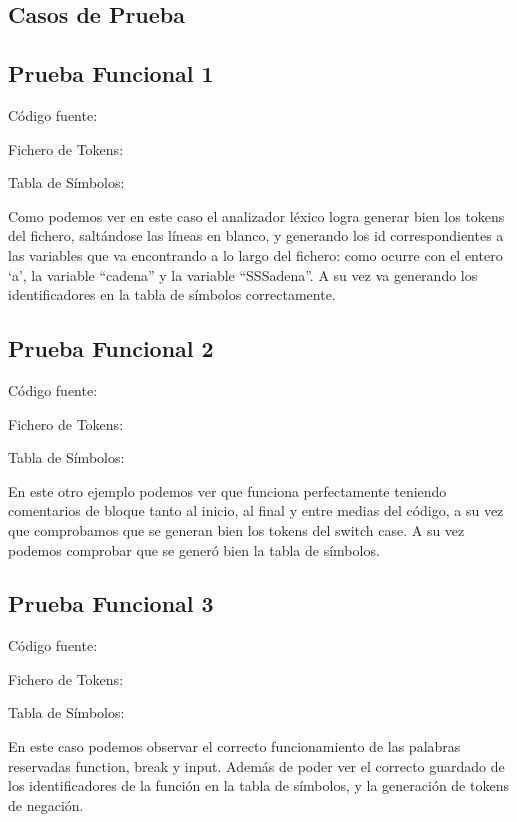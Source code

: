 \documentclass{article}[a4paper]
\begin{document}
\newpage
\begin{appendices}

\section{Casos de Prueba}

\subsection{Prueba Funcional 1}
Código fuente:

\hspace{\parindent} Fichero de Tokens:

\hspace{\parindent} Tabla de Símbolos:


Como podemos ver en este caso el analizador léxico logra generar bien los tokens del fichero,
saltándose las líneas en blanco, y generando los id correspondientes a las variables que va
encontrando a lo largo del fichero: como ocurre con el entero ‘a’, la variable “cadena” y la
variable “SSSadena”. A su vez va generando los identificadores en la tabla de símbolos correctamente.

\subsection{Prueba Funcional 2}
Código fuente:

\hspace{\parindent} Fichero de Tokens:

\hspace{\parindent} Tabla de Símbolos:

\hspace{\parindent} En este otro ejemplo podemos ver que funciona perfectamente teniendo comentarios de bloque tanto al inicio, al final y entre medias del código, a su vez que comprobamos que se
generan bien los tokens del switch case. A su vez podemos comprobar que se generó bien la
tabla de símbolos.

\subsection{Prueba Funcional 3}
Código fuente:

\hspace{\parindent} Fichero de Tokens:

\hspace{\parindent} Tabla de Símbolos:

\hspace{\parindent} En este caso podemos observar el correcto funcionamiento de las palabras reservadas function, break y input. Además de poder ver el correcto guardado de los identificadores de la función en la tabla de símbolos, y la generación de tokens de negación.


\end{appendices}
\end{document}
